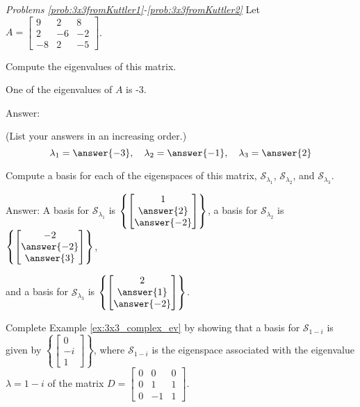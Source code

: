 \documentclass{ximera}
\begin{document}
\emph{Problems \ref{prob:3x3fromKuttler1}-\ref{prob:3x3fromKuttler2}}
Let $A=\begin{bmatrix} 9 & 2 & 8\\ 2 & -6 & -2\\ -8 & 2 & -5\end{bmatrix}$.  

\begin{problem}\label{prob:3x3fromKuttler1}
Compute the eigenvalues of this matrix. 
\begin{hint}
One of the eigenvalues of $A$ is -3.
\end{hint}

Answer:

(List your answers in an increasing order.)
$$\lambda_1 = \answer{-3},\quad \lambda_2 = \answer{-1},\quad \lambda_3 = \answer{2}$$
\end{problem}

\begin{problem}\label{prob:3x3fromKuttler2}
Compute a basis for each of the eigenspaces of this matrix,  $\mathcal{S}_{\lambda_1}$, $\mathcal{S}_{\lambda_2}$, and $\mathcal{S}_{\lambda_3}$.

Answer:
A basis for $\mathcal{S}_{\lambda_1}$ is $\left\{\begin{bmatrix}1\\\answer{2}\\\answer{-2}\end{bmatrix}\right\}$, 
a basis for $\mathcal{S}_{\lambda_2}$ is $\left\{\begin{bmatrix}-2\\\answer{-2}\\\answer{3}\end{bmatrix}\right\}$,

and a basis for $\mathcal{S}_{\lambda_3}$ is $\left\{\begin{bmatrix}2\\\answer{1}\\\answer{-2}\end{bmatrix}\right\}$.
\end{problem}


\begin{problem}\label{prob:3x3_complex_ev}
Complete Example \ref{ex:3x3_complex_ev} by showing that a basis for $\mathcal{S}_{1-i}$ is given by $\left\{\begin{bmatrix}0\\-i\\1\end{bmatrix}\right\}$, where  $\mathcal{S}_{1-i}$ is the eigenspace associated with the eigenvalue $\lambda=1-i$ of the matrix $D=\begin{bmatrix} 0&0&0\\ 0 &1&1\\ 0 & -1&1\end{bmatrix}$.
\end{problem}
\end{document}
